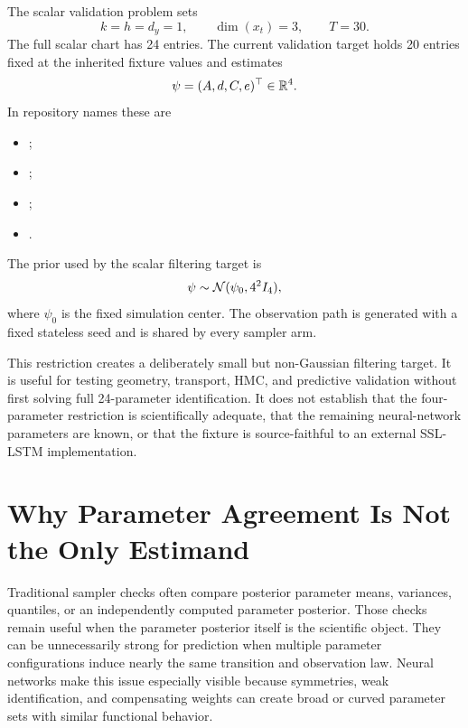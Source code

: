 The scalar validation problem sets
\begin{equation}
  k=h=d_y=1,
  \qquad \dim(x_t)=3,
  \qquad T=30.
  \label{eq:bf-scalar-ssl-lstm-dimensions}
\end{equation}
The full scalar chart has 24 entries.  The current validation target holds 20
entries fixed at the inherited fixture values and estimates
\begin{equation}
  \psi=(A,d,C,e)^\top\in\mathbb{R}^4.
  \label{eq:bf-scalar-ssl-lstm-free-parameters}
\end{equation}
In repository names these are
\begin{itemize}
  \item {};
  \item {};
  \item {};
  \item {}.
\end{itemize}
The prior used by the scalar filtering target is
\begin{equation}
  \psi\sim\mathcal{N}(\psi_0,4^2 I_4),
  \label{eq:bf-scalar-ssl-lstm-prior}
\end{equation}
where $\psi_0$ is the fixed simulation center.  The observation path is
generated with a fixed stateless seed and is shared by every sampler arm.

This restriction creates a deliberately small but non-Gaussian filtering
target.  It is useful for testing geometry, transport, HMC, and predictive
validation without first solving full 24-parameter identification.  It does
not establish that the four-parameter restriction is scientifically adequate,
that the remaining neural-network parameters are known, or that the fixture is
source-faithful to an external SSL-LSTM implementation.

\section{Why Parameter Agreement Is Not the Only Estimand}
\label{sec:bf-predictive-vs-parameter-agreement}

Traditional sampler checks often compare posterior parameter means,
variances, quantiles, or an independently computed parameter posterior.  Those
checks remain useful when the parameter posterior itself is the scientific
object.  They can be unnecessarily strong for prediction when multiple
parameter configurations induce nearly the same transition and observation
law.  Neural networks make this issue especially visible because symmetries,
weak identification, and compensating weights can create broad or curved
parameter sets with similar functional behavior.

